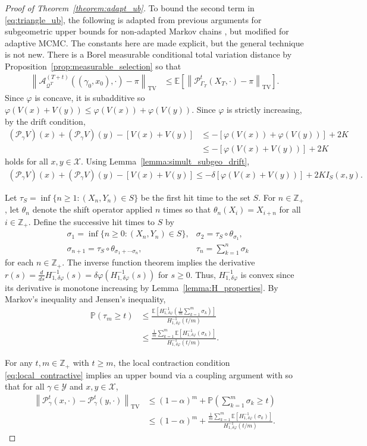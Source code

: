 \documentclass[12pt]{article}
\theoremstyle{plain}
\theoremstyle{remark}
\newcommand{\norm}[1]{\left\lVert#1\right\rVert}
\newcommand{\Z}{\mathbb{Z}}
\newcommand{\Q}{\mathcal{Q}}
\newcommand{\E}{\mathbb{E}}
\newcommand{\Prob}{\mathbb{P}}
\renewcommand{\P}{\mathcal{P}}
\newcommand{\A}{\mathcal{A}}
\newcommand{\X}{\mathcal{X}}
\newcommand{\Y}{\mathcal{Y}}
\newcommand{\C}{\mathcal{C}}
\let\temp\phi
\let\phi\varphi
\let\varphi\temp
\newcommand{\eq}[1]{\begin{align*}#1\end{align*}}
\begin{document}
\begin{proof}[Proof of Theorem~\ref{theorem:adapt_ub}]
To bound the second term in \eqref{eq:triangle_ub}, the following is adapted from previous arguments for subgeometric upper bounds for non-adapted Markov chains \citep{durmus:etal:2016}, but modified for adaptive MCMC.
The constants here are made explicit, but the general technique is not new.
There is a Borel measurable conditional total variation distance by Proposition~\ref{prop:measurable_selection} so that
\eq{
\norm{ \A_{\Q^{T}}^{(T + t)}((\gamma_0, x_0), \cdot) - \pi }_{\text{TV}}
&\le \E \left[ \norm{ \P_{\Gamma_{T}}^{t}(X_{T}, \cdot) - \pi }_{\text{TV}} \right].
}
Since $\phi$ is concave, it is subadditive so $\phi(V(x) + V(y)) \le \phi( V(x) ) + \phi( V(y) )$.
Since $\phi$ is strictly increasing, by the drift condition,
\eq{
(\P_\gamma V)(x) + (\P_\gamma V)(y) - [ V(x) + V(y) ]
&\le -[ \phi( V(x) ) + \phi( V(y) ) ] + 2K
\\
&\le -[ \phi( V(x) + V(y) ) ] + 2 K
}
holds for all $x, y \in \X$.
Using Lemma~\ref{lemma:simult_subgeo_drift},
\eq{
(\P_\gamma V)(x) + (\P_\gamma V)(y) - [ V(x) + V(y) ]
\le -\delta [ \phi( V(x) + V(y) ) ] + 2 K I_{S}(x, y).
}


Let $\tau_S = \inf\{ n \ge 1 : (X_n, Y_n) \in S \}$ be the first hit time to the set $S$.
For $n \in \Z_+$, let $\theta_n$ denote the shift operator applied $n$ times so that $\theta_n(X_{i}) = X_{i + n}$ for all $i \in \Z_+$.
Define the successive hit times to $S$ by 
\eq{
&\sigma_1 = \inf\{ n \ge 0 : (X_n, Y_n) \in S \},
&\sigma_2 = \tau_S \circ \theta_{\sigma_1},
\\
&\sigma_{n + 1} = \tau_S \circ \theta_{\sigma_1 + \cdots \sigma_n},
&\tau_n = \sum_{k = 1}^{n} \sigma_k
}
for each $n \in \Z_+$.
The inverse function theorem implies the derivative 
$
r(s)
= \frac{d}{ds} H^{-1}_{1, \delta \phi}(s) 
= \delta \phi(H^{-1}_{1, \delta \phi}(s))
$
for $s \ge 0$.
Thus, $H_{1, \delta \phi}^{-1}$ is convex since its derivative is monotone increasing by Lemma~\ref{lemma:H_properties}.
By Markov's inequality and Jensen's inequality,
\eq{
\Prob(\tau_m \ge t)
&\le \frac{ \E\left[ H_{1, \delta \phi}^{-1}\left( \frac{ 1 }{m} \sum_{k = 1}^m \sigma_k \right) \right]
}{
H_{1, \delta \phi}^{-1}(t/m)
}
\\
&\le \frac{ \frac{ 1 }{m} \sum_{k = 1}^m \E\left[ H_{1, \delta \phi}^{-1}( \sigma_k ) \right]
}{
H_{1, \delta \phi}^{-1}(t/m)
}.
}

For any $t, m \in \Z_+$ with $t \ge m$, the local contraction condition \eqref{eq:local_contractive} implies an upper bound via a coupling argument with \citep[Lemma 3.1]{jarner:tweedie:2001} so that for all $\gamma \in \Y$ and $x, y \in \X$,
\begin{align*}
\norm{ \P_{\gamma}^t(x, \cdot) - \P_{\gamma}^t(y, \cdot) }_{\text{TV}}
&\le (1 - \alpha)^m + \Prob\left( \sum_{k = 1}^m \sigma_k \ge t \right)
\\
&\le (1 - \alpha)^m 
+ \frac{ \frac{ 1 }{m} \sum_{k = 1}^m \E\left[ H_{1, \delta \phi}^{-1}( \sigma_k ) \right]
}{
H_{1, \delta \phi}^{-1}(t/m)
}.
\end{align*}


\end{proof}
\end{document}
